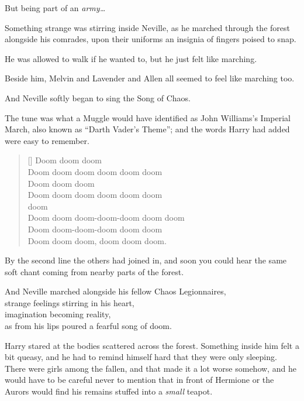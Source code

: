 But being part of an \emph{army…}

Something strange was stirring inside Neville, as he marched through the forest alongside his comrades, upon their uniforms an insignia of fingers poised to snap.

He was allowed to walk if he wanted to, but he just felt like marching.

Beside him, Melvin and Lavender and Allen all seemed to feel like marching too.

And Neville softly began to sing the Song of Chaos.

The tune was what a Muggle would have identified as John Williams’s Imperial March, also known as “Darth Vader’s Theme”; and the words Harry had added were easy to remember.

\baselineskip\settowidth{\versewidth}{Doom doom doom-doom-doom doom doom}
\begin{verse}[\versewidth] Doom doom doom\\
Doom doom doom doom doom doom\\
Doom doom doom\\
Doom doom doom doom doom doom\\
 doom \\
Doom doom doom-doom-doom doom doom\\
Doom doom-doom-doom doom doom\\
Doom doom doom, doom doom doom.
\end{verse}\baselineskip

By the second line the others had joined in, and soon you could hear the same soft chant coming from nearby parts of the forest.

And Neville marched alongside his fellow Chaos Legionnaires,\\
strange feelings stirring in his heart,\\
imagination becoming reality,\\
as from his lips poured a fearful song of doom.

\later

Harry stared at the bodies scattered across the forest. Something inside him felt a bit queasy, and he had to remind himself hard that they were only sleeping. There were girls among the fallen, and that made it a lot worse somehow, and he would have to be careful never to mention that in front of Hermione or the Aurors would find his remains stuffed into a \emph{small} teapot.

